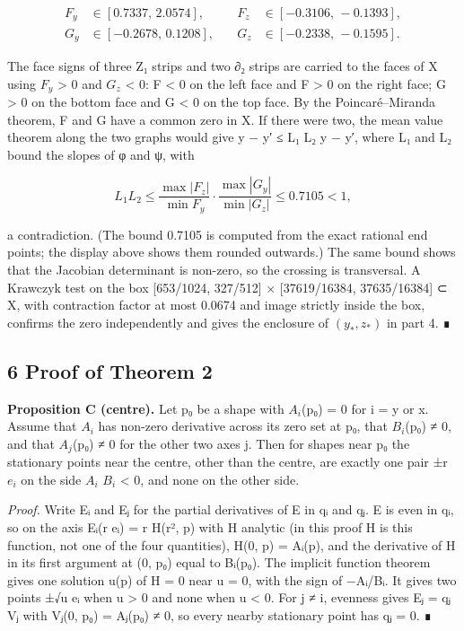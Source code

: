 \documentclass[
  11pt,
]{article}
\begin{document}
\[
\begin{aligned}F_y&\in[0.7337,\,2.0574],&\quad F_z&\in[-0.3106,\,-0.1393],\\ G_y&\in[-0.2678,\,0.1208],&\quad G_z&\in[-0.2338,\,-0.1595].\end{aligned}
\]

The face signs of three Z₁ strips and two ∂₂ strips are carried to the
faces of X using \(F_{y}\) \textgreater{} 0 and \(G_{z}\) \textless{} 0:
F \textless{} 0 on the left face and F \textgreater{} 0 on the right
face; G \textgreater{} 0 on the bottom face and G \textless{} 0 on the
top face. By the Poincaré--Miranda theorem, F and G have a common zero
in X. If there were two, the mean value theorem along the two graphs
would give \textbar y − y′\textbar{} ≤ L₁ L₂ \textbar y − y′\textbar,
where L₁ and L₂ bound the slopes of φ and ψ, with

\[
L_1L_2\le\frac{\max|F_z|}{\min F_y}\cdot\frac{\max|G_y|}{\min|G_z|}\le 0.7105<1,
\]

a contradiction. (The bound 0.7105 is computed from the exact rational
end points; the display above shows them rounded outwards.) The same
bound shows that the Jacobian determinant is non-zero, so the crossing
is transversal. A Krawczyk test on the box {[}653/1024, 327/512{]} ×
{[}37619/16384, 37635/16384{]} ⊂ X, with contraction factor at most
0.0674 and image strictly inside the box, confirms the zero
independently and gives the enclosure of \((y_*, z_*)\) in part 4. ∎

\subsection{6 Proof of Theorem 2}

\textbf{Proposition C (centre).} Let p₀ be a shape with \(A_{i}\)(p₀) =
0 for i = y or x. Assume that \(A_{i}\) has non-zero derivative across
its zero set at p₀, that \(B_{i}\)(p₀) ≠ 0, and that \(A_{j}\)(p₀) ≠ 0
for the other two axes j. Then for shapes near p₀ the stationary points
near the centre, other than the centre, are exactly one pair ±r
\(e_{i}\) on the side \(A_{i}\) \(B_{i}\) \textless{} 0, and none on the
other side.

\emph{Proof.} Write Eᵢ and Eⱼ for the partial derivatives of E in qᵢ and
qⱼ. E is even in qᵢ, so on the axis Eᵢ(r eᵢ) = r H(r², p) with H
analytic (in this proof H is this function, not one of the four
quantities), H(0, p) = Aᵢ(p), and the derivative of H in its first
argument at (0, p₀) equal to Bᵢ(p₀). The implicit function theorem gives
one solution u(p) of H = 0 near u = 0, with the sign of −Aᵢ/Bᵢ. It gives
two points ±√u eᵢ when u \textgreater{} 0 and none when u \textless{} 0.
For j ≠ i, evenness gives Eⱼ = qⱼ Vⱼ with Vⱼ(0, p₀) = Aⱼ(p₀) ≠ 0, so
every nearby stationary point has qⱼ = 0. ∎
\end{document}
